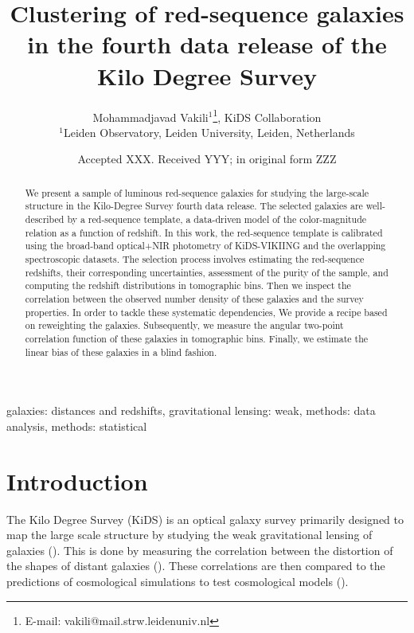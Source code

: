 \documentclass[fleqn,usenatbib,useAMS]{mnras}
\title[KiDS DR4 LRG clustering]{Clustering of red-sequence galaxies in the fourth data release of the Kilo Degree Survey}
\author[M. Vakili et al.]{
Mohammadjavad Vakili$^{1}$\thanks{E-mail: vakili@mail.strw.leidenuniv.nl}, KiDS Collaboration\\
$^{1}$Leiden Observatory, Leiden University, Leiden, Netherlands
}
\date{Accepted XXX. Received YYY; in original form ZZZ}
\begin{document}
\label{firstpage}
\pagerange{\pageref{firstpage}--\pageref{lastpage}}
\maketitle

\begin{abstract}

We present a sample of luminous red-sequence galaxies for studying the large-scale structure in the Kilo-Degree Survey fourth data release. The selected galaxies are well-described by a red-sequence template, a data-driven model of the color-magnitude relation as a function of redshift. In this work, the red-sequence template is calibrated using the broad-band optical+NIR photometry of KiDS-VIKIING and the overlapping spectroscopic datasets. The selection process involves estimating the red-sequence redshifts, their corresponding uncertainties, assessment of the purity of the sample, and computing the redshift distributions in tomographic bins. Then we inspect the correlation between the observed number density of these galaxies and the survey properties. In order to tackle these systematic dependencies, We provide a recipe based on reweighting the galaxies. Subsequently, we measure the angular two-point correlation function of these galaxies in tomographic bins. Finally, we estimate the linear bias of these galaxies in a blind fashion. 

\end{abstract}

\begin{keywords}
galaxies: distances and redshifts, gravitational lensing: weak, methods: data analysis, methods: statistical
\end{keywords}


\section{Introduction}

The Kilo Degree Survey (KiDS) is an optical galaxy survey primarily designed to map the large scale structure by studying the weak gravitational lensing of galaxies (\citealt{kuijken2015, kuijken2019}). This is done by measuring the correlation between the distortion of the shapes of distant galaxies (\citealt{hendrick2017,hendrik2018}). These correlations are then compared to the predictions of cosmological simulations to test cosmological models (\citealt{heymans2013,jee2016,hendrick2017,joudaki2017,troxel2017,joudaki2019, hikage2019}). 
\end{document}

